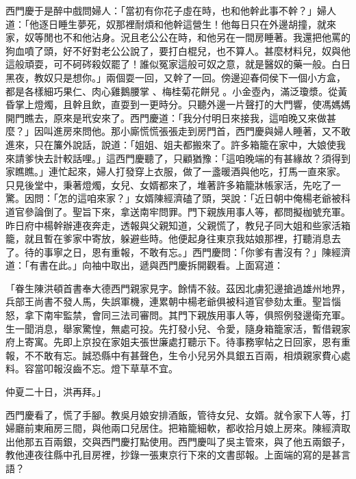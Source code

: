 \begin{showcontents}{}
西門慶于是醉中戲問婦人：「當初有你花子虛在時，也和他幹此事不幹？」婦人道：「他逐日睡生夢死，奴那裡耐煩和他幹這營生！他每日只在外邊胡撞，就來家，奴等閒也不和他沾身。況且老公公在時，和他另在一間房睡著。我還把他罵的狗血噴了頭，好不好對老公公說了，要打白棍兒，也不算人。甚麼材料兒，奴與他這般頑耍，可不砢硶殺奴罷了！誰似冤家這般可奴之意，就是醫奴的藥一般。白日黑夜，教奴只是想你。」兩個耍一回，又幹了一回。傍邊迎春伺侯下一個小方盒，都是各樣細巧果仁、肉心雞鵝腰掌 、梅桂菊花餅兒 。小金壺內，滿泛瓊漿。從黃昏掌上燈燭，且幹且飲，直耍到一更時分。只聽外邊一片聲打的大門響，使馮媽媽開門瞧去，原來是玳安來了。西門慶道：「我分付明日來接我，這咱晚又來做甚麼？」因叫進房來問他。那小廝慌慌張張走到房門首，西門慶與婦人睡著，又不敢進來，只在簾外說話，說道：「姐姐、姐夫都搬來了。許多箱籠在家中，大娘使我來請爹快去計較話哩。」這西門慶聽了，只顧猶豫：「這咱晚端的有甚緣故？須得到家瞧瞧。」連忙起來，婦人打發穿上衣服，做了一盞暖酒與他吃，打馬一直來家。只見後堂中，秉著燈燭，女兒、女婿都來了，堆著許多箱籠牀帳家活，先吃了一驚。因問：「怎的這咱來家？」女婿陳經濟磕了頭，哭說：「近日朝中俺楊老爺被科道官參論倒了。聖旨下來，拿送南牢問罪。門下親族用事人等，都問擬枷號充軍。昨日府中楊幹辦連夜奔走，透報與父親知道，父親慌了，教兒子同大姐和些家活箱籠，就且暫在爹家中寄放，躲避些時。他便起身往東京我姑娘那裡，打聽消息去了。待的事寧之日，恩有重報，不敢有忘。」西門慶問：「你爹有書沒有？」陳經濟道：「有書在此。」向袖中取出，遞與西門慶拆開觀看。上面寫道：

「眷生陳洪頓首書奉大德西門親家見字。餘情不敍。茲因北虜犯邊搶過雄州地界，兵部王尚書不發人馬，失誤軍機，連累朝中楊老爺俱被科道官參劾太重。聖旨惱怒，拿下南牢監禁，會同三法司審問。其門下親族用事人等，俱照例發邊衛充軍。生一聞消息，舉家驚惶，無處可投。先打發小兒、令愛，隨身箱籠家活，暫借親家府上寄寓。先即上京投在家姐夫張世廉處打聽示下。待事務寧帖之日回家，恩有重報，不不敢有忘。誠恐縣中有甚聲色，生令小兒另外具銀五百兩，相煩親家費心處料。容當叩報沒齒不忘。燈下草草不宜。

仲夏二十日，洪再拜。」

西門慶看了，慌了手腳。教吳月娘安排酒飯，管待女兒、女婿。就令家下人等，打婦廳前東廂房三間，與他兩口兒居住。把箱籠細軟，都收拾月娘上房來。陳經濟取出他那五百兩銀，交與西門慶打點使用。西門慶叫了吳主管來，與了他五兩銀子，教他連夜往縣中孔目房裡，抄錄一張東京行下來的文書邸報。上面端的寫的是甚言語？


\end{showcontents}
